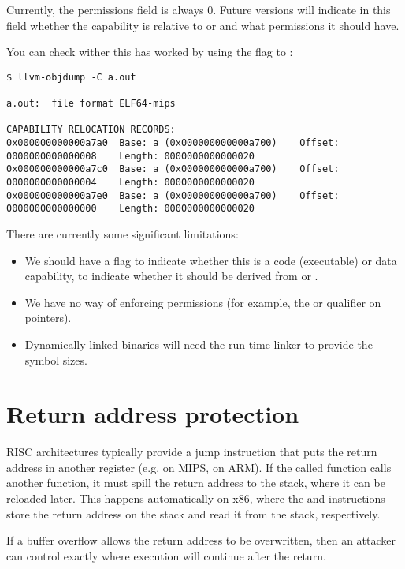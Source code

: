 Currently, the permissions field is always 0.
Future versions will indicate in this field whether the capability is relative to  or  and what permissions it should have.

You can check wither this has worked by using the  flag to :

\begin{verbatim}
$ llvm-objdump -C a.out

a.out:	file format ELF64-mips

CAPABILITY RELOCATION RECORDS:
0x000000000000a7a0	Base: a (0x000000000000a700)	Offset: 0000000000000008	Length: 0000000000000020
0x000000000000a7c0	Base: a (0x000000000000a700)	Offset: 0000000000000004	Length: 0000000000000020
0x000000000000a7e0	Base: a (0x000000000000a700)	Offset: 0000000000000000	Length: 0000000000000020
\end{verbatim}

There are currently some significant limitations:

\begin{itemize}
	\item We should have a flag to indicate whether this is a code (executable) or data capability, to indicate whether it should be derived from  or .
	\item We have no way of enforcing permissions (for example, the  or  qualifier on pointers).
	\item Dynamically linked binaries will need the run-time linker to provide the symbol sizes.
\end{itemize}

\section{Return address protection}

RISC architectures typically provide a jump instruction that puts the return address in another register (e.g.  on MIPS,  on ARM).
If the called function calls another function, it must spill the return address to the stack, where it can be reloaded later.
This happens automatically on x86, where the  and  instructions store the return address on the stack and read it from the stack, respectively.

If a buffer overflow allows the return address to be overwritten, then an attacker can control exactly where execution will continue after the return.

